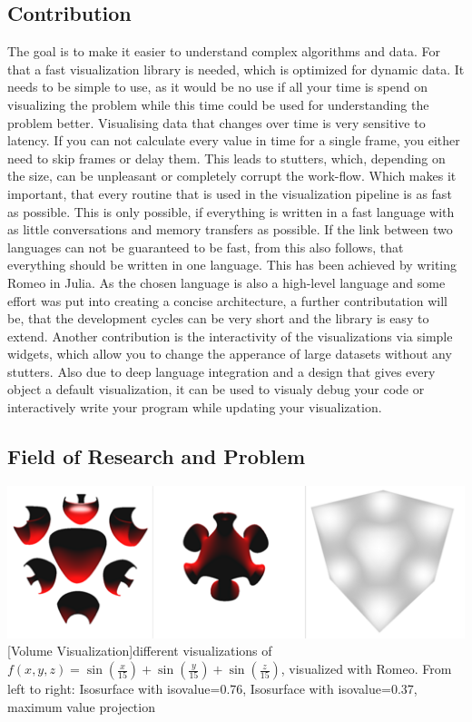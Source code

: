 \subsection{Contribution}
The goal is to make it easier to understand complex algorithms and data.
For that a fast visualization library is needed, which is optimized for dynamic data.
It needs to be simple to use, as it would be no use if all your time is spend on visualizing the problem while this time could be used for understanding the problem better.
Visualising data that changes over time is very sensitive to latency. If you can not calculate every value in time for a single frame, you either need to skip frames or delay them.
This leads to stutters, which, depending on the size, can be unpleasant or completely corrupt the work-flow.
Which makes it important, that every routine that is used in the visualization pipeline is as fast as possible.
This is only possible, if everything is written in a fast language with as little conversations and memory transfers as possible. If the link between two languages can not be guaranteed to be fast, from this also follows, that everything should be written in one language.
This has been achieved by writing Romeo in Julia.
As the chosen language is also a high-level language and some effort was put into creating a concise architecture, a further contributation will be, that the development cycles can be very short and the library is easy to extend.
Another contribution is the interactivity of the visualizations via simple widgets, which allow you to change the apperance of large datasets without any stutters.
Also due to deep language integration and a design that gives every object a default visualization, it can be used to visualy debug your code or interactively write your program while updating your visualization.


\subsection{Field of Research and Problem}

\vspace{1em}
\begin{minipage}{\linewidth}
    \centering
    \includegraphics[width=0.7\linewidth]{graphics/surfaces.png}
    [Volume Visualization]{different visualizations of $f(x,y,z)=\sin(\frac{x}{15})+\sin(\frac{y}{15})+\sin(\frac{z}{15})$, visualized with Romeo. From left to right: Isosurface with isovalue=0.76, Isosurface with isovalue=0.37, maximum value projection}
    \label{fig:volume}
\end{minipage}
\vspace{1em}

